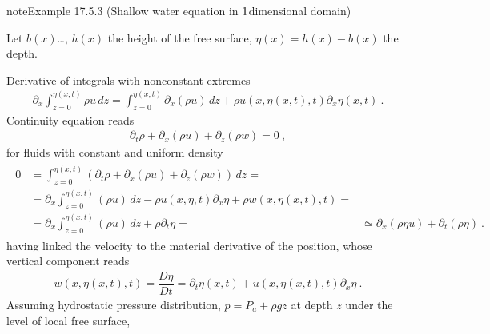 \documentclass[letterpaper,10pt,english]{jupyterBook}
\begin{document}
\begin{sphinxadmonition}{note}{Example 17.5.3 (Shallow water equation in \protect\(1\protect\)\sphinxhyphen{}dimensional domain)}



\sphinxAtStartPar
Let \(b(x)\)…, \(h(x)\) the height of the free surface, \(\eta(x) = h(x) - b(x)\) the depth.

\sphinxAtStartPar
Derivative of integrals with non\sphinxhyphen{}constant extremes
\begin{equation*}
\begin{split}\partial_x \int_{z=0}^{\eta(x,t)} \rho u \, dz = \int_{z=0}^{\eta(x,t)} \partial_x (\rho u) \, dz + \rho u(x,\eta(x,t),t) \partial_x \eta(x,t) \ .\end{split}
\end{equation*}
\sphinxAtStartPar
Continuity equation reads
\begin{equation*}
\begin{split}\partial_t \rho + \partial_x (\rho u ) + \partial_z (\rho w) = 0 \ ,\end{split}
\end{equation*}
\sphinxAtStartPar
for fluids with constant and uniform density
\begin{equation*}
\begin{split}\begin{aligned}
  0
  & = \int_{z=0}^{\eta(x,t)} \left( \partial_t \rho + \partial_x (\rho u) + \partial_z (\rho w) \right) \, dz = \\
  & = \partial_x \int_{z=0}^{\eta(x,t)} (\rho u) \, dz - \rho u(x,\eta,t) \partial_x \eta + \rho w(x,\eta(x,t),t) = \\
  & = \partial_x \int_{z=0}^{\eta(x,t)} (\rho u) \, dz + \rho \partial_t \eta = 
  & \simeq \partial_x \left(  \rho \eta u \right) + \partial_t \left( \rho \eta \right) \ .
\end{aligned}\end{split}
\end{equation*}
\sphinxAtStartPar
having linked the velocity to the material derivative of the position, whose vertical component reads
\begin{equation*}
\begin{split}w(x,\eta(x,t), t) = \dfrac{D \eta}{Dt} = \partial_t \eta(x,t) + u(x,\eta(x,t),t) \partial_x \eta \ .\end{split}
\end{equation*}
\sphinxAtStartPar
Assuming hydrostatic pressure distribution, \(p = P_a + \rho g z\) at depth \(z\) under the level of local free surface,


\end{sphinxadmonition}
\end{document}
